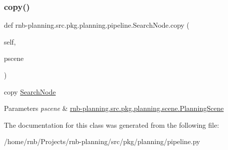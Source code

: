 \subsubsection{\texorpdfstring{copy()}{copy()}}
{\footnotesize\ttfamily def rnb-\/planning.\+src.\+pkg.\+planning.\+pipeline.\+Search\+Node.\+copy (\begin{DoxyParamCaption}\item[{}]{self,  }\item[{}]{pscene }\end{DoxyParamCaption})}



copy \hyperlink{classrnb-planning_1_1src_1_1pkg_1_1planning_1_1pipeline_1_1_search_node}{Search\+Node} 


\begin{DoxyParams}{Parameters}
{\em pscene} & \hyperlink{classrnb-planning_1_1src_1_1pkg_1_1planning_1_1scene_1_1_planning_scene}{rnb-\/planning.\+src.\+pkg.\+planning.\+scene.\+Planning\+Scene} \\
\hline
\end{DoxyParams}


The documentation for this class was generated from the following file\+:\begin{DoxyCompactItemize}
\item 
/home/rnb/\+Projects/rnb-\/planning/src/pkg/planning/pipeline.\+py\end{DoxyCompactItemize}
